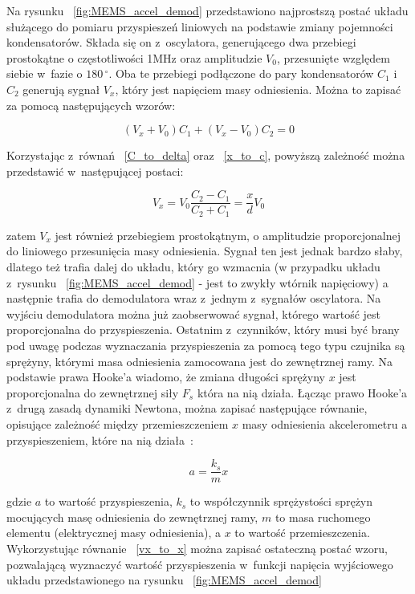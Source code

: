 Na rysunku ~\ref{fig:MEMS_accel_demod} przedstawiono najprostszą postać układu służącego do pomiaru przyspieszeń liniowych na podstawie zmiany pojemności kondensatorów. Składa się on z~oscylatora, generującego dwa przebiegi prostokątne o częstotliwości 1MHz oraz amplitudzie $V_0$, przesunięte względem siebie w~fazie o $180\,^{\circ}$. Oba te przebiegi podłączone do pary kondensatorów $C_1$ i~$C_2$ generują sygnał $V_x$, który jest napięciem masy odniesienia. Można to zapisać za pomocą następujących wzorów:

\begin{equation}
	(V_x + V_0)C_1 + (V_x - V_0)C_2 = 0
\end{equation}  

Korzystając z~równań ~\ref{C_to_delta} oraz ~\ref{x_to_c}, powyższą zależność można przedstawić w~następującej postaci:

\begin{equation}
V_x = V_0\frac{C_2 - C_1}{C_2 + C_1} = \frac{x}{d}V_0
\label{vx_to_x}
\end{equation}

zatem $V_x$ jest również przebiegiem prostokątnym, o amplitudzie proporcjonalnej do liniowego przesunięcia masy odniesienia. Sygnał ten jest jednak bardzo słaby, dlatego też trafia dalej do układu, który go wzmacnia (w przypadku układu z~rysunku ~\ref{fig:MEMS_accel_demod} -  jest to zwykły wtórnik napięciowy) a następnie trafia do demodulatora wraz z~jednym z~sygnałów oscylatora. Na wyjściu demodulatora można już zaobserwować sygnał, którego wartość jest proporcjonalna do przyspieszenia. Ostatnim z~czynników, który musi być brany pod uwagę podczas wyznaczania przyspieszenia za pomocą tego typu czujnika są sprężyny, którymi masa odniesienia zamocowana jest do zewnętrznej ramy. Na podstawie prawa Hooke'a wiadomo, że zmiana długości sprężyny $x$ jest proporcjonalna do zewnętrznej siły $F_s$ która na nią działa. Łącząc prawo Hooke'a z~drugą zasadą dynamiki Newtona, można zapisać następujące równanie, opisujące zależność między przemieszczeniem $x$ masy odniesienia akcelerometru a przyspieszeniem, które na nią działa~\cite{mems12}:

\begin{equation}
	a = \frac{k_s}{m}x
\end{equation}  

gdzie $a$ to wartość przyspieszenia, $k_s$ to współczynnik sprężystości sprężyn mocujących masę odniesienia do zewnętrznej ramy, $m$ to masa ruchomego elementu (elektrycznej masy odniesienia), a $x$ to wartość przemieszczenia. Wykorzystując równanie ~\ref{vx_to_x} można zapisać ostateczną postać wzoru, pozwalającą wyznaczyć wartość przyspieszenia w~funkcji napięcia wyjściowego układu przedstawionego na rysunku ~\ref{fig:MEMS_accel_demod}

